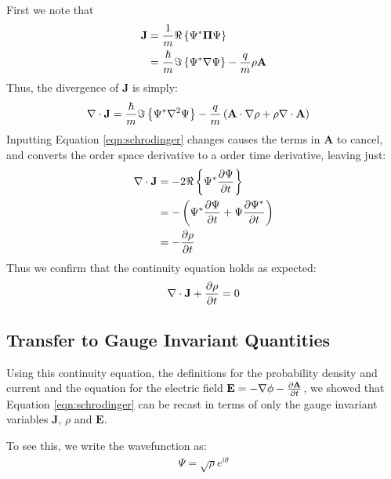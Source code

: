 \noindent First we note that
\begin{align}
    \mathbf{J} &= \frac{1}{m} \Re \left\{ \Psi^* \mathbf{\Pi} \Psi \right\} \\
               &= \frac{\hbar}{m} \Im \left\{ \Psi^* \nabla \Psi \right\} - \frac{q}{m} \rho
                    \mathbf{A}
\end{align}
Thus, the divergence of $\mathbf{J}$ is simply:
\begin{align}
    \nabla \cdot \mathbf{ J } &= \frac{\hbar}{m} \Im \left\{ \Psi^* \nabla^2 \Psi \right\} - \frac{q}{m} \left(
                \mathbf{A} \cdot \nabla \rho + \rho \nabla \cdot
                \mathbf{A} \right)
\end{align}
Inputting Equation \ref{eqn:schrodinger} changes causes the terms in
$\mathbf{A}$ to cancel, and converts the  order space
derivative to a  order time derivative, leaving just:
\begin{align}
    \nabla \cdot \mathbf{ J } &= -2 \Re \left\{ \Psi^* \frac{\partial \Psi}{\partial t} \right\} \\
            &= - \left( \Psi^* \frac{\partial \Psi}{\partial t}
               + \Psi \frac{\partial \Psi^*}{\partial t} \right) \\
            &= - \frac{\partial \rho}{\partial t}
\end{align}
Thus we confirm that the continuity equation holds as expected:
\begin{align}
    \nabla \cdot \mathbf{ J } + \frac{\partial \rho}{\partial t} = 0
    \label{eqn:continuity}
\end{align}

\subsection{Transfer to Gauge Invariant Quantities}

Using this continuity equation, the definitions for the probability density and
current and the equation for the electric field $\mathbf{E} = - \nabla \phi -
\frac{\partial \mathbf{A}}{\partial t}$, we showed that Equation \ref{eqn:schrodinger} can be recast
in terms of only the gauge invariant variables $\mathbf{J}$, $\rho$ and
$\mathbf{E}$.

To see this, we write the wavefunction as:
\begin{align}
    \Psi = \sqrt{\rho} e^{i \theta}
\end{align}
